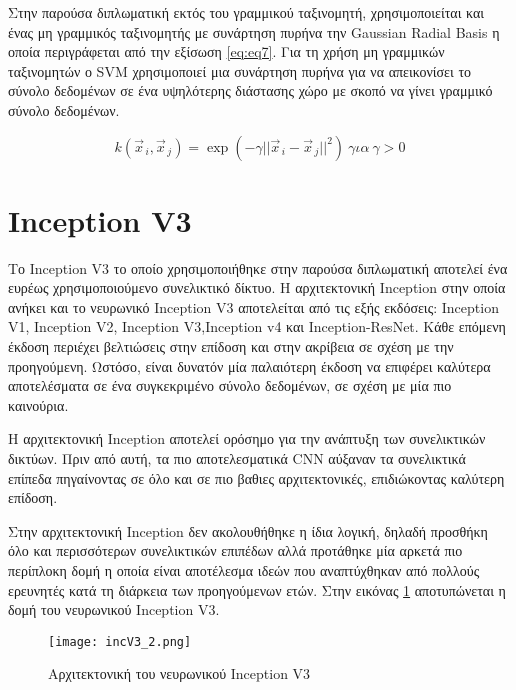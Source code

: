 Στην παρούσα διπλωματική εκτός του γραμμικού ταξινομητή, χρησιμοποιείται και ένας μη γραμμικός ταξινομητής με συνάρτηση πυρήνα την Gaussian Radial Basis η οποία περιγράφεται από την εξίσωση \ref{eq:eq7}. Για τη χρήση μη γραμμικών ταξινομητών ο  SVM χρησιμοποιεί μια συνάρτηση πυρήνα για να απεικονίσει το σύνολο δεδομένων σε ένα υψηλότερης διάστασης χώρο με σκοπό να γίνει γραμμικό σύνολο δεδομένων.


\begin{equation} \label{eq:eq7}
k(\vec{x}_{\,i},\vec{x}_{\,j}) = \exp(-\gamma ||\vec{x}_{\,i}- \vec{x}_{\,j} ||^2) ~ για ~ \gamma>0
\end{equation}



\section{Inception V3}
\label{sec:3.2}


Το Inception V3\cite{Szegedy} το οποίο χρησιμοποιήθηκε στην παρούσα διπλωματική αποτελεί ένα ευρέως χρησιμοποιούμενο συνελικτικό δίκτυο. Η αρχιτεκτονική Inception στην οποία ανήκει και το νευρωνικό Inception V3 αποτελείται από τις εξής εκδόσεις: Inception V1, Inception V2, Inception V3,Inception v4 και Inception-ResNet. Κάθε επόμενη έκδοση περιέχει βελτιώσεις στην επίδοση και στην ακρίβεια σε σχέση με την προηγούμενη. Ωστόσο, είναι δυνατόν μία παλαιότερη έκδοση να επιφέρει καλύτερα αποτελέσματα σε ένα  συγκεκριμένο σύνολο δεδομένων, σε σχέση με μία πιο καινούρια.


Η αρχιτεκτονική Inception αποτελεί ορόσημο για την ανάπτυξη των συνελικτικών δικτύων. Πριν από αυτή, τα πιο αποτελεσματικά CNN αύξαναν τα συνελικτικά επίπεδα πηγαίνοντας σε όλο και σε πιο βαθιες αρχιτεκτονικές, επιδιώκοντας καλύτερη επίδοση.


Στην αρχιτεκτονική Inception δεν ακολουθήθηκε η ίδια λογική, δηλαδή προσθήκη όλο και περισσότερων συνελικτικών επιπέδων αλλά προτάθηκε μία αρκετά πιο περίπλοκη δομή η οποία είναι αποτέλεσμα ιδεών που αναπτύχθηκαν από πολλούς ερευνητές κατά τη διάρκεια των προηγούμενων ετών.
Στην εικόνας \ref{figure:incV32} αποτυπώνεται η δομή του νευρωνικού Inception V3.


\begin{figure}[!h]

    \centering
      \texttt{[image: incV3\_2.png]} \caption{Αρχιτεκτονική του νευρωνικού Inception V3}      
      \label{figure:incV32}  

  \end{figure}
  
